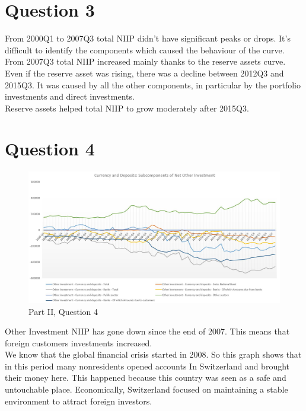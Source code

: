 \documentclass[
	12pt, %
]{fphw}
\begin{document}
\section*{Question 3}
From 2000Q1 to 2007Q3 total NIIP didn't have significant peaks or drops. It's difficult to identify the components which caused the behaviour of the curve.
From 2007Q3 total NIIP increased mainly thanks to the reserve assets curve. \\
Even if the reserve asset was rising, there was a decline between 2012Q3 and 2015Q3. It was caused by all the other components, in particular by the portfolio investments and direct investments. \\
Reserve assets helped total NIIP to grow moderately after 2015Q3. 

\section*{Question 4}
\begin{figure}[h]
\centering 
\includegraphics[scale=0.7]{ass1es3pt2.JPG} 
\caption{Part II, Question 4} 
\end{figure}
Other Investment NIIP has gone down since the end of 2007. This means that foreign customers investments increased. \\
We know that the global financial crisis started in 2008. So this graph shows that in this period many nonresidents opened accounts In Switzerland and brought their money here. This happened because this country was seen as a safe and untouchable place. Economically, Switzerland focused on maintaining a stable environment to attract foreign investors.
\end{document}
